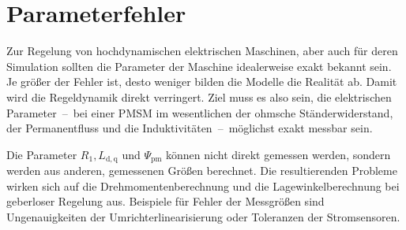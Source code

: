 \documentclass[conference,twocolumn]{IEEEtran}
\newcommand{\x}[1]{\mathrm{#1}}
\begin{document}
\section{Parameterfehler}\label{sec:parameterfehler}

Zur Regelung von hochdynamischen elektrischen Maschinen, aber auch für deren Simulation sollten die Parameter der Maschine idealerweise exakt bekannt sein.
Je größer der Fehler ist, desto weniger bilden die Modelle die Realität ab.
Damit wird die Regeldynamik direkt verringert.
Ziel muss es also sein, die elektrischen Parameter~--~bei einer PMSM im wesentlichen der ohmsche Ständerwiderstand, der Permanentfluss und die Induktivitäten~--~möglichst exakt messbar sein.

Die Parameter $R_\x{1}, L_\x{d,q}$ und $\Psi_\x{pm}$ können nicht direkt gemessen werden, sondern werden aus anderen, gemessenen Größen berechnet.
Die resultierenden Probleme wirken sich auf die Drehmomentenberechnung und die Lagewinkelberechnung bei geberloser Regelung aus.
Beispiele für Fehler der Messgrößen sind Ungenauigkeiten der Umrichterlinearisierung oder Toleranzen der Stromsensoren.


%
%

\end{document}
